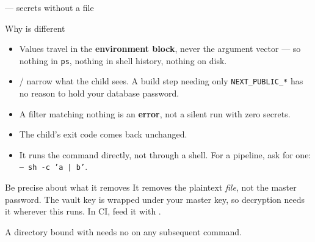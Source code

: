 \begin{frame}[fragile]{ — secrets without a file}
\end{frame}

\begin{frame}{Why  is different}
  \begin{itemize}
    \item Values travel in the \textbf{environment block}, never the argument
          vector — so nothing in \texttt{ps}, nothing in shell history,
          nothing on disk.
    \item {} /  narrow what the child sees.
          A build step needing only \texttt{NEXT\_PUBLIC\_*} has no reason to
          hold your database password.
    \item A filter matching nothing is an \textbf{error}, not a silent run with
          zero secrets.
    \item The child's exit code comes back unchanged.
    \item It runs the command directly, not through a shell. For a pipeline,
          ask for one: \texttt{-- sh -c 'a | b'}.
  \end{itemize}

  \vspace{0.6em}
  \begin{alertblock}{Be precise about what it removes}
    It removes the plaintext \emph{file}, not the master password. The vault key
    is wrapped under your master key, so decryption needs it wherever this runs.
    In CI, feed it with .
  \end{alertblock}
\end{frame}

\begin{frame}[fragile]{}

  {\footnotesize A directory bound with  needs no
   on any subsequent command.}
\end{frame}
